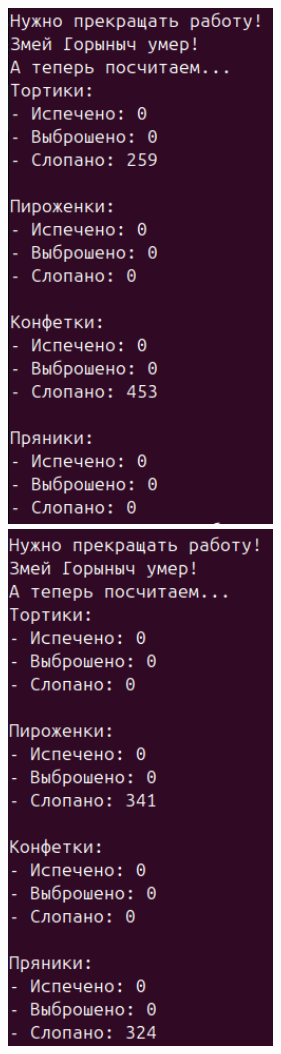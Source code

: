 \documentclass[a4paper,14pt]{extarticle}
\begin{document}
\includegraphics[width=70mm]{processes_output_3_5}
\includegraphics[width=70mm]{processes_output_3_6}
\end{document}
